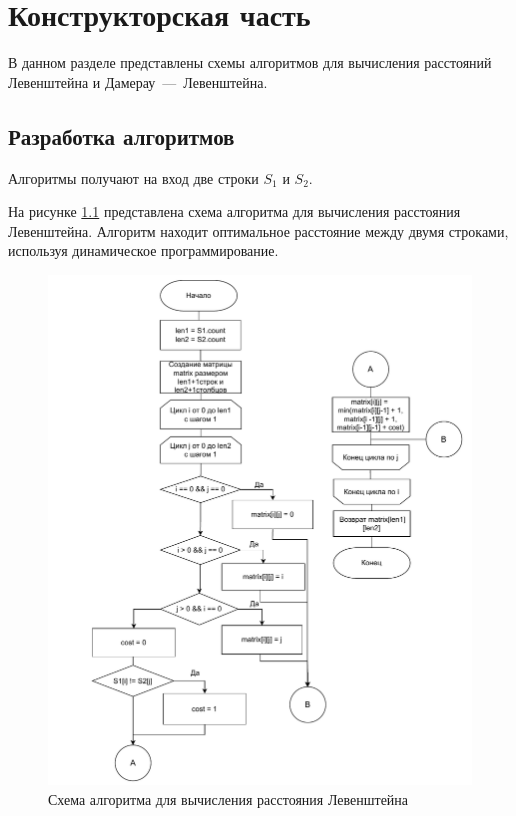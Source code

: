 \chapter{Конструкторская часть}

В данном разделе представлены схемы алгоритмов для вычисления расстояний Левенштейна и Дамерау~---~Левенштейна.

\section{Разработка алгоритмов}


Алгоритмы получают на вход две строки $S_1$ и $S_2$. 

На рисунке \ref{fig:Liter} представлена схема алгоритма для вычисления расстояния Левенштейна. 
Алгоритм находит оптимальное расстояние между двумя строками, используя динамическое программирование.

\begin{figure}[h]
	\centering
	\includegraphics[height=0.8\textheight]{img/levenshtein.pdf}
	\caption{Схема алгоритма для вычисления расстояния Левенштейна}
	\label{fig:Liter}
\end{figure}

